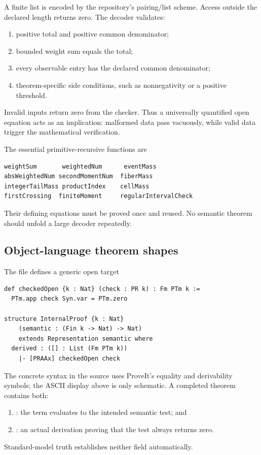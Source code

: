 A finite list is encoded by the repository's pairing/list scheme.  Access
outside the declared length returns zero.  The decoder validates:
\begin{enumerate}
\item positive total and positive common denominator;
\item bounded weight sum equals the total;
\item every observable entry has the declared common denominator;
\item theorem-specific side conditions, such as nonnegativity or a positive
  threshold.
\end{enumerate}
Invalid inputs return zero from the checker.  Thus a universally quantified
open equation  acts as an implication: malformed data pass
vacuously, while valid data trigger the mathematical verification.

The essential primitive-recursive functions are
\begin{verbatim}
weightSum       weightedNum      eventMass
absWeightedNum secondMomentNum  fiberMass
integerTailMass productIndex    cellMass
firstCrossing  finiteMoment     regularIntervalCheck
\end{verbatim}
Their defining equations must be proved once and reused.  No semantic theorem
should unfold a large decoder repeatedly.

\subsection{Object-language theorem shapes}

The file  defines a generic open target

\begin{lstlisting}[language={}]
def checkedOpen {k : Nat} (check : PR k) : Fm PTm k :=
  PTm.app check Syn.var = PTm.zero

structure InternalProof {k : Nat}
    (semantic : (Fin k -> Nat) -> Nat)
    extends Representation semantic where
  derived : ([] : List (Fm PTm k))
    |- [PRAAx] checkedOpen check
\end{lstlisting}

The concrete syntax in the source uses ProveIt's equality and derivability
symbols; the ASCII display above is only schematic.  A completed theorem
contains both:
\begin{enumerate}
\item {}: the  term evaluates to the intended semantic
  test; and
\item {}: an actual derivation proving that the test always
  returns zero.
\end{enumerate}
Standard-model truth establishes neither field automatically.

